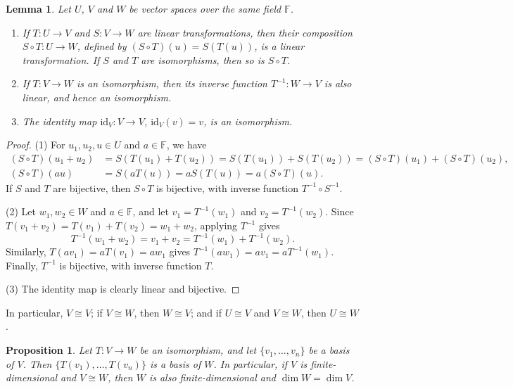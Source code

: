 \documentclass[11pt]{article}
\theoremstyle{definition}
\theoremstyle{plain}
\newtheorem{proposition}[definition]{Proposition}
\newtheorem{lemma}[definition]{Lemma}
\theoremstyle{remark}
\begin{document}
\begin{lemma}\label{lem:composition}
    Let $U$, $V$ and $W$ be vector spaces over the same field $\mathbb{F}$.
    \begin{enumerate}
        \item If $T: U \to V$ and $S: V \to W$ are linear transformations, then their composition $S \circ T: U \to W$, defined by $(S \circ T)(u) = S(T(u))$, is a linear transformation. If $S$ and $T$ are isomorphisms, then so is $S \circ T$.
        \item If $T: V \to W$ is an isomorphism, then its inverse function $T^{-1}: W \to V$ is also linear, and hence an isomorphism.
        \item The identity map $\mathrm{id}_V: V \to V$, $\mathrm{id}_V(v) = v$, is an isomorphism.
    \end{enumerate}
\end{lemma}

\begin{proof}
    (1) For $u_1, u_2, u \in U$ and $a \in \mathbb{F}$, we have
    \begin{align*}
        (S \circ T)(u_1 + u_2) &= S(T(u_1) + T(u_2)) = S(T(u_1)) + S(T(u_2)) = (S \circ T)(u_1) + (S \circ T)(u_2), \\
        (S \circ T)(a u) &= S(a T(u)) = a S(T(u)) = a (S \circ T)(u).
    \end{align*}
    If $S$ and $T$ are bijective, then $S \circ T$ is bijective, with inverse function $T^{-1} \circ S^{-1}$.

    (2) Let $w_1, w_2 \in W$ and $a \in \mathbb{F}$, and let $v_1 = T^{-1}(w_1)$ and $v_2 = T^{-1}(w_2)$. Since $T(v_1 + v_2) = T(v_1) + T(v_2) = w_1 + w_2$, applying $T^{-1}$ gives
    \[T^{-1}(w_1 + w_2) = v_1 + v_2 = T^{-1}(w_1) + T^{-1}(w_2).\]
    Similarly, $T(a v_1) = a T(v_1) = a w_1$ gives $T^{-1}(a w_1) = a v_1 = a T^{-1}(w_1)$. Finally, $T^{-1}$ is bijective, with inverse function $T$.

    (3) The identity map is clearly linear and bijective.
\end{proof}

In particular, $V \cong V$; if $V \cong W$, then $W \cong V$; and if $U \cong V$ and $V \cong W$, then $U \cong W$.

\begin{proposition}\label{prop:iso-basis}
    Let $T: V \to W$ be an isomorphism, and let $\{v_1, \ldots, v_n\}$ be a basis of $V$. Then $\{T(v_1), \ldots, T(v_n)\}$ is a basis of $W$. In particular, if $V$ is finite-dimensional and $V \cong W$, then $W$ is also finite-dimensional and $\dim W = \dim V$.
\end{proposition}
\end{document}
